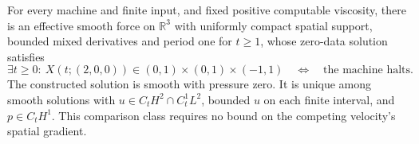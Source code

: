 \begin{theorem}
\label{ba:bounded-box-euclidean}
For every machine and finite input, and fixed positive computable
viscosity, there is an effective smooth force on $\mathbb R^3$ with
uniformly compact spatial support, bounded mixed derivatives and period
one for $t\ge1$, whose zero-data solution satisfies
\[
 \exists t\ge0:\ X(t;(2,0,0))\in(0,1)\times(0,1)\times(-1,1)
 \quad\Longleftrightarrow\quad\text{the machine halts}.
\]
The constructed solution is smooth with pressure zero.  It is unique
among smooth solutions with $u\in C_tH^2\cap C_t^1L^2$, bounded
$u$ on each finite interval, and $p\in C_tH^1$.  This comparison class
requires no bound on the competing velocity's spatial gradient.
\end{theorem}

